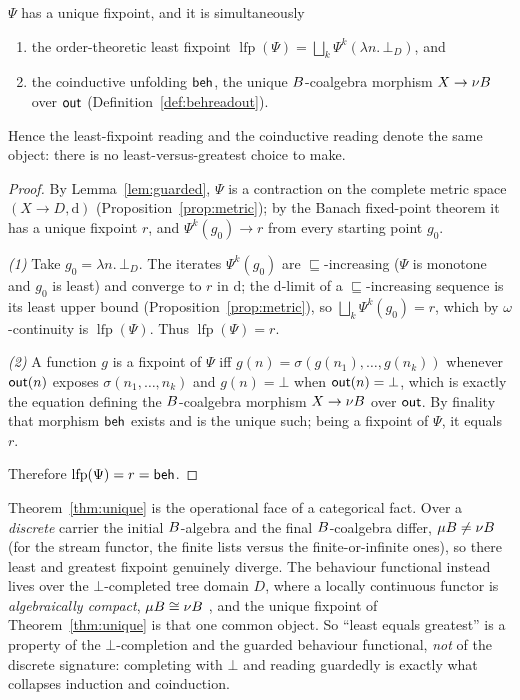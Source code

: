 \begin{theorem}\label{thm:unique}
  $\Psi$ has a unique fixpoint, and it is simultaneously
  \begin{enumerate}
    \item the order-theoretic least fixpoint $\operatorname{lfp}(\Psi) = \bigsqcup_{k} \Psi^{k}(\lambda n.\,\bot_D)$, and
    \item the coinductive unfolding $\mathsf{beh}$, the unique $B$-coalgebra morphism $X \to \nu B$ over
      $\mathsf{out}$ (Definition~\ref{def:behreadout}).
  \end{enumerate}
  Hence the least-fixpoint reading and the coinductive reading denote the same object: there is no
  least-versus-greatest choice to make.
\end{theorem}
\begin{proof}
  By Lemma~\ref{lem:guarded}, $\Psi$ is a contraction on the complete metric space $(X \to D, \mathrm{d})$
  (Proposition~\ref{prop:metric}); by the Banach fixed-point theorem  it has a unique
  fixpoint $r$, and $\Psi^{k}(g_0) \to r$ from every starting point $g_0$.

  \emph{(1)} Take $g_0 = \lambda n.\,\bot_D$. The iterates $\Psi^{k}(g_0)$ are $\sqsubseteq$-increasing
  ($\Psi$ is monotone and $g_0$ is least) and converge to $r$ in $\mathrm{d}$; the $\mathrm{d}$-limit of a
  $\sqsubseteq$-increasing sequence is its least upper bound (Proposition~\ref{prop:metric}), so
  $\bigsqcup_{k} \Psi^{k}(g_0) = r$, which by $\omega$-continuity is $\operatorname{lfp}(\Psi)$. Thus
  $\operatorname{lfp}(\Psi) = r$.

  \emph{(2)} A function $g$ is a fixpoint of $\Psi$ iff $g(n) = \sigma(g(n_1),\dots,g(n_k))$ whenever
  $\mathsf{out}(n)$ exposes $\sigma(n_1,\dots,n_k)$ and $g(n) = \bot$ when $\mathsf{out}(n) = \bot$, which is exactly
  the equation defining the $B$-coalgebra morphism $X \to \nu B$ over $\mathsf{out}$. By finality that
  morphism $\mathsf{beh}$ exists and is the unique such; being a fixpoint of $\Psi$, it equals $r$.

  Therefore $\operatorname{lfp}(\Psi) = r = \mathsf{beh}$.
\end{proof}

\begin{remark}\label{rem:compact}
  Theorem~\ref{thm:unique} is the operational face of a categorical fact. Over a \emph{discrete} carrier
  the initial $B$-algebra and the final $B$-coalgebra differ, $\mu B \neq \nu B$ (for the
  stream functor, the finite lists versus the finite-or-infinite ones), so there least and greatest
  fixpoint genuinely diverge. The behaviour functional instead lives over the $\bot$-completed tree domain $D$, where a
  locally continuous functor is \emph{algebraically compact}, $\mu B \cong \nu B$
  , and the unique fixpoint of Theorem~\ref{thm:unique} is that one
  common object. So ``least equals greatest'' is a property of the $\bot$-completion and the guarded
  behaviour functional, \emph{not} of the discrete signature: completing with $\bot$ and reading guardedly is exactly
  what collapses induction and coinduction.
\end{remark}

